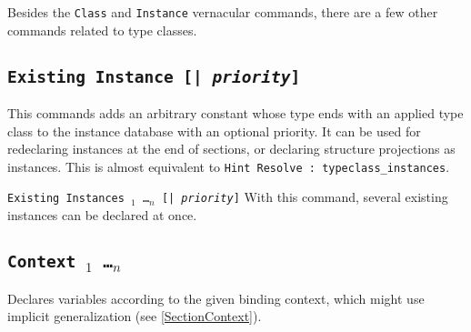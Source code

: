 Besides the {\tt Class} and {\tt Instance} vernacular commands, there
are a few other commands related to type classes.

\subsection{\tt Existing Instance {\ident} [| \textit{priority}]}
\label{ExistingInstance}

This commands adds an arbitrary constant whose type ends with an applied
type class to the instance database with an optional priority. It can be used
for redeclaring instances at the end of sections, or declaring structure
projections as instances. This is almost equivalent to {\tt Hint Resolve
{\ident} : typeclass\_instances}.

\begin{Variants}
\item {\tt Existing Instances {\ident}$_1$ \ldots {\ident}$_n$
  [| \textit{priority}]}
  With this command, several existing instances can be declared at once.
\end{Variants}

\subsection{\tt Context {\binder$_1$ \ldots \binder$_n$}}
\label{Context}

Declares variables according to the given binding context, which might
use implicit generalization (see \ref{SectionContext}).

\label{typeclasseseauto}

